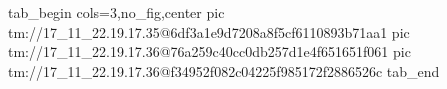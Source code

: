  
 
 
 
 

\qqSecOrig


\ifcmt
  tab_begin cols=3,no_fig,center
    pic tm://17_11_22.19.17.35@6df3a1e9d7208a8f5cf6110893b71aa1
    pic tm://17_11_22.19.17.36@76a259c40cc0db257d1e4f651651f061
    pic tm://17_11_22.19.17.36@f34952f082c04225f985172f2886526c
  tab_end
\fi

